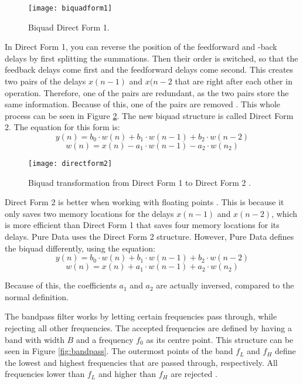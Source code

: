 \begin{figure}
\centering
\texttt{[image: biquadform1]}
\caption{Biquad Direct Form 1.}
\label{fig:biquadform1}
\end{figure}

In Direct Form 1, you can reverse the position of the feedforward and -back delays by first splitting the summations. Then their order is switched, so that the feedback delays come first and the feedforward delays come second. This creates two pairs of the delays \(x(n-1)\) and \(x(n-2\) that are right after each other in operation. Therefore, one of the pairs are redundant, as the two pairs store the same information. Because of this, one of the pairs are removed \cite{Redmon2003}. This whole process can be seen in Figure \ref{fig:biquadtransform}. The new biquad structure is called Direct Form 2. The equation for this form is\cite{Nederland2016}:
\[y(n) = b_0 \cdot w(n) + b_1 \cdot w(n-1) + b_2 \cdot w(n-2)\]
\[w(n) = x(n) - a_1 \cdot w(n-1) - a_2 \cdot w(n_2)\]

\begin{figure}
\centering
\texttt{[image: directform2]}
\caption{Biquad transformation from Direct Form 1 to Direct Form 2 \cite{Redmon2003}.}
\label{fig:biquadtransform}
\end{figure}

Direct Form 2 is better when working with floating points \cite{Redmon2003}. This is because it only saves two memory locations for the delays \(x(n-1)\) and \(x(n-2)\), which is more efficient than Direct Form 1 that saves four memory locations for its delays. Pure Data uses the Direct Form 2 structure. However, Pure Data defines the biquad differently, using the equation:
\[y(n) = b_0 \cdot w(n) + b_1 \cdot w(n-1) + b_2 \cdot w(n-2)\]
\[w(n) = x(n) + a_1 \cdot w(n-1) + a_2 \cdot w(n_2)\]

Because of this, the coefficients \(a_1\) and \(a_2\) are actually inversed, compared to the normal definition.

The bandpass filter works by letting certain frequencies pass through, while rejecting all other frequencies. The accepted frequencies are defined by having a band with width \(B\) and a frequency \(f_0\) as its  centre point. This structure can be seen in Figure \ref{fig:bandpass}. The outermost points of the band \(f_L\) and \(f_H\) define the lowest and highest frequencies that are passed through, respectively. All frequencies lower than \(f_L\) and higher than \(f_H\) are rejected \cite{zolzer2011dafx}.

